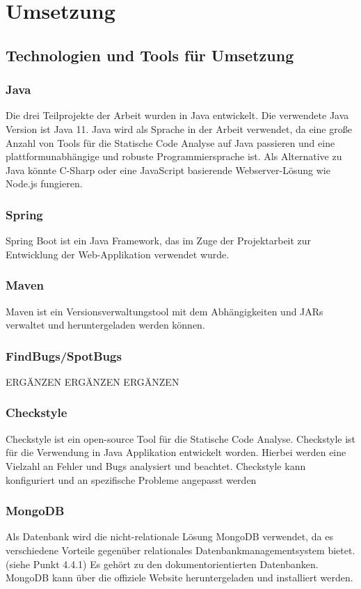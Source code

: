 
\chapter{Umsetzung}
\section{Technologien und Tools für Umsetzung } 

\subsection{Java} 
Die drei Teilprojekte der Arbeit wurden in Java entwickelt. Die verwendete Java Version ist Java 11. Java wird als Sprache in der Arbeit verwendet, da eine große Anzahl von Tools für die Statische Code Analyse auf Java passieren und eine plattformunabhängige und robuste Programmiersprache ist. Als Alternative zu Java könnte C-Sharp oder eine JavaScript basierende Webserver-Lösung wie Node.js fungieren.

\subsection{Spring} 
Spring Boot ist ein Java Framework, das im Zuge der Projektarbeit zur Entwicklung der Web-Applikation verwendet wurde.

\subsection{Maven} 
Maven ist ein Versionsverwaltungstool mit dem Abhängigkeiten und JARs verwaltet und heruntergeladen werden können.

\subsection{FindBugs/SpotBugs} 
ERGÄNZEN ERGÄNZEN ERGÄNZEN 

\subsection{Checkstyle} 
Checkstyle ist ein open-source Tool für die Statische Code Analyse. Checkstyle ist für die Verwendung in Java Applikation entwickelt worden. Hierbei werden eine Vielzahl an Fehler und Bugs analysiert und beachtet. Checkstyle kann konfiguriert und an spezifische Probleme angepasst werden

\subsection{MongoDB} 
Als Datenbank wird die nicht-relationale Lösung MongoDB verwendet, da es verschiedene Vorteile gegenüber relationales Datenbankmanagementsystem bietet. (siehe Punkt 4.4.1) Es gehört zu den dokumentorientierten Datenbanken.
MongoDB kann über die offiziele Website heruntergeladen und installiert werden. \cite{mongoDbManual}


